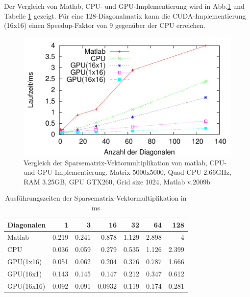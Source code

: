 


Der Vergleich von Matlab, CPU- und GPU-Implementierung wird in
Abb.\ref{sparse_ergebnis} und Tabelle \ref{tab_sparse_result} gezeigt.
Für eine 128-Diagonalmatix kann die CUDA-Implementierung (16x16)
einen Speedup-Faktor von 9 gegenüber der CPU erreichen.


\begin{figure}[htbp]
\includegraphics{../ausarbeitung/sparse/sparsegp.pdf}
\caption{Vergleich der Sparsematrix-Vektormultiplikation von matlab, CPU-und GPU-Implementierung.
Matrix 5000x5000, Quad CPU 2.66GHz, RAM 3.25GB, GPU GTX260, Grid size 1024, Matlab v.2009b}
\label{sparse_ergebnis}
\end{figure}


\begin{table}
\renewcommand{\arraystretch}{1.3}
\caption{Ausführungszeiten der Sparsematrix-Vektormultiplikation in ms}
\label{tab_sparse_result}
\centering
\begin{tabular}{|l|r|r|r|r|r|r|}

\hline
Diagonalen& 1& 3& 16& 32& 64 &128\\


\hline
\hline
Matlab     &   0.219   &   0.241&   0.878  &  1.129 &  2.898  & 4\\
CPU        & 	0.036 &   0.059& 	0.279  &  0.535 &  1.126  & 2.399 \\
GPU(1x16)  & 0.051     &   0.062 &  0.204  &  0.376 &  0.787  & 1.666\\
GPU(16x1)  & 0.143     &	0.145 &	0.147  &  0.212 &	0.347 &	0.612\\

GPU(16x16)     & 0.092 &	0.091  &	0.0932 &	0.119&	0.174 &	0.281\\

\hline
\end{tabular}
\end{table}